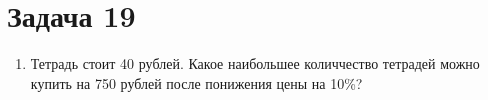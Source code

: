 \chapter{Задача 19}	
	\begin{enumerate}
		
	\item Тетрадь стоит 40 рублей. Какое наибольшее количчество тетрадей можно купить на 750 рублей после понижения цены на 10\%?
	
\end{enumerate}
